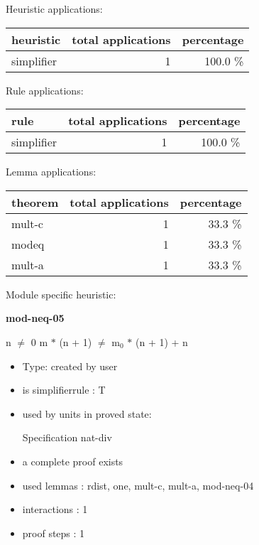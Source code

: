 \documentclass[a4paper]{article}
\begin{document}
\medskip


Heuristic applications:

\begin{supertabular}{l|r|r}
heuristic	& total applications & percentage \\ \hline
simplifier & 1 & 100.0 \% \\

\end{supertabular}

Rule applications:

\begin{supertabular}{l|r|r}
rule	        & total applications & percentage \\ \hline
simplifier & 1 & 100.0 \% \\

\end{supertabular}

Lemma applications:

\begin{supertabular}{l|r|r}
theorem	        & total applications & percentage \\ \hline
mult-c & 1 & 33.3 \% \\
modeq & 1 & 33.3 \% \\
mult-a & 1 & 33.3 \% \\

\end{supertabular}

Module specific heuristic:

\pagebreak

{\LARGE\bf mod-neq-05}\label{lemma-mod-neq-05}

\medskip

 \Fol n $\neq$ 0 \Imp m $*$ (n + 1) $\neq$ $\mbox{m}_{0}$ $*$ (n + 1) + n

\begin{itemize}

\item Type: created by user

\item is simplifierrule : T
\item used by units in proved state:

Specification nat-div
\item       a complete proof exists
\item       used lemmas  : rdist, one, mult-c, mult-a, mod-neq-04
\item       interactions : 1
\item       proof steps  : 1
\end{itemize}
\end{document}
